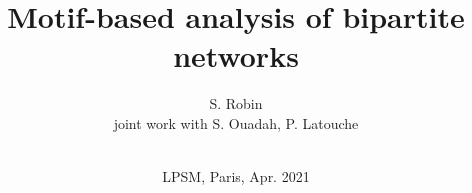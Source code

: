 \documentclass[8pt]{beamer}
\begin{document}

\title[Bipartite motifs]{Motif-based analysis of bipartite networks \\}

\author[S. Robin]{S. Robin \\ \medskip
joint work with S. Ouadah, P. Latouche \\ ~}


\date[Paris, Apr.'21]{LPSM, Paris, Apr. 2021}

\maketitle

\end{document}
